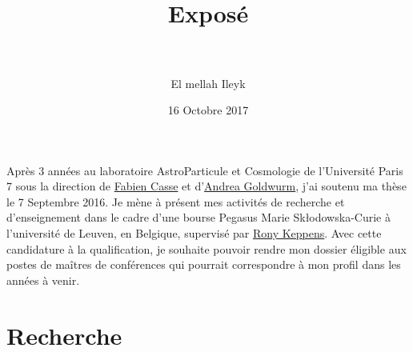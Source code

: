 \documentclass[a4paper,12pt,onecolumn]{article}
\title{	
\vspace*{-2cm}
\normalfont \tiny 
\horrule{0.5pt} \\[0.4cm] %
\huge Expos\'e \\ %
\horrule{2pt} \\[0.5cm] %
}
\author{E{\sc l mellah} Ileyk} %
\date{\tiny \normalsize 16 Octobre 2017}
\begin{document}


\maketitle
\thispagestyle{empty}

\indent Après 3 années au laboratoire AstroParticule et Cosmologie de l'Université Paris 7 sous la direction de \href{http://www.apc.univ-paris7.fr/~fcasse/}{Fabien Casse} et d'\href{http://www.apc.univ-paris7.fr/APC_CS/en/users/goldwurm}{Andrea Goldwurm}, j'ai soutenu ma thèse le 7 Septembre 2016. Je mène à présent mes activités de recherche et d'enseignement dans le cadre d'une bourse Pegasus Marie Sk\l odowska-Curie à l'université de Leuven, en Belgique, supervisé par \href{https://perswww.kuleuven.be/~u0016541/}{Rony Keppens}. Avec cette candidature à la qualification, je souhaite pouvoir rendre mon dossier éligible aux postes de ma\^itres de conférences qui pourrait correspondre à mon profil dans les ann\'ees \`a venir.

\section*{Recherche}
\end{document}
